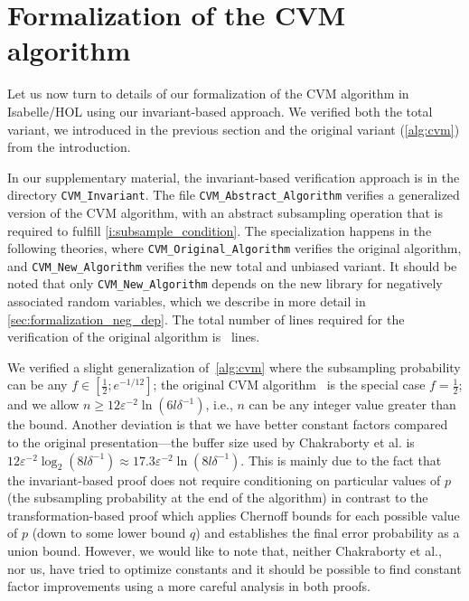 \section{Formalization of the CVM algorithm}\label{sec:formalization}
Let us now turn to details of our formalization of the CVM algorithm in Isabelle/HOL using our invariant-based approach.
We verified both the total variant, we introduced in the previous section and the original variant (\cref{alg:cvm}) from the introduction.

\begin{note}
In our supplementary material, the invariant-based verification approach is in the directory \verb|CVM_Invariant|.
The file \verb|CVM_Abstract_Algorithm| verifies a generalized version of the CVM algorithm, with an abstract subsampling operation that is required to fulfill \cref{i:subsample_condition}.
The specialization happens in the following theories, where \verb|CVM_Original_Algorithm| verifies the original algorithm, and \verb|CVM_New_Algorithm| verifies the new total and unbiased variant.
It should be noted that only \verb|CVM_New_Algorithm| depends on the new library for negatively associated random variables, which we describe in more detail in \cref{sec:formalization_neg_dep}.
The total number of lines required for the verification of the original algorithm is \locnew~lines.
\lipicsEnd\end{note}

We verified a slight generalization of~\cref{alg:cvm} where the subsampling probability can be any $f \in [\frac{1}{2};e^{-1/12}]$; the original CVM algorithm~\cite{chakraborty2022} is the special case $f=\frac{1}{2}$; and we allow $n \geq 12 \varepsilon^{-2} \ln(6 l \delta^{-1})$, i.e., $n$ can be any integer value greater than the bound.
Another deviation is that we have better constant factors compared to the original presentation---the buffer size used by Chakraborty et al. is $12 \varepsilon^{-2} \log_2(8 l \delta^{-1}) \approx 17.3 \varepsilon^{-2} \ln(8 l \delta^{-1})$.
This is mainly due to the fact that the invariant-based proof does not require conditioning on particular values of $p$ (the subsampling probability at the end of the algorithm) in contrast to the transformation-based proof which applies Chernoff bounds for each possible value of $p$ (down to some lower bound $q$) and establishes the final error probability as a union bound.
However, we would like to note that, neither Chakraborty et al., nor us, have tried to optimize constants and it should be possible to find constant factor improvements using a more careful analysis in both proofs.

